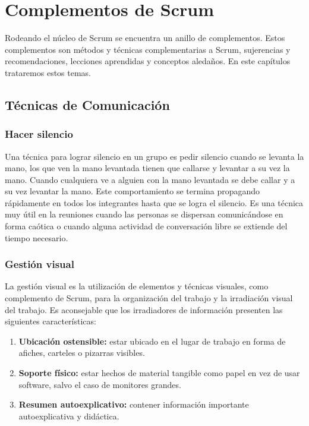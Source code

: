 \chapter{Complementos de Scrum}

Rodeando el núcleo de Scrum se encuentra un anillo de complementos. Estos complementos son métodos y técnicas complementarias a Scrum, sujerencias y recomendaciones, lecciones aprendidas y conceptos aledaños. En este capítulos trataremos estos temas.



\newpage
\section{Técnicas de Comunicación}

\subsection{Hacer silencio}

Una técnica para lograr silencio en un grupo es pedir silencio cuando se levanta la mano, los que ven la mano levantada tienen que callarse y levantar a su vez la mano. Cuando cualquiera ve a alguien con la mano levantada se debe callar y a su vez levantar la mano. Este comportamiento se termina propagando rápidamente en todos los integrantes hasta que se logra el silencio. Es una técnica muy útil en la reuniones cuando las personas se dispersan comunicándose en forma caótica o cuando alguna actividad de conversación libre se extiende del tiempo necesario.


\subsection{Gestión visual}

La gestión visual es la utilización de elementos y técnicas visuales, como complemento de Scrum, para la organización del trabajo y la irradiación visual del trabajo. Es aconsejable que los irradiadores de información presenten las siguientes características:

\begin{enumerate}

\item \textbf{Ubicación ostensible:} estar ubicado en el lugar de trabajo en forma de afiches, carteles o pizarras visibles.

\item \textbf{Soporte físico:} estar hechos de material tangible como papel en vez de usar software, salvo el caso de monitores grandes.

\item \textbf{Resumen autoexplicativo:} contener información importante autoexplicativa y didáctica.

\end{enumerate}

